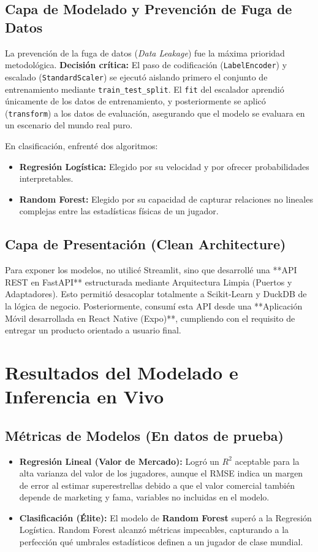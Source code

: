 \documentclass[12pt,letterpaper]{article}
\begin{document}
\subsection{Capa de Modelado y Prevención de Fuga de Datos}
La prevención de la fuga de datos (\textit{Data Leakage}) fue la máxima prioridad metodológica.
\textbf{Decisión crítica:} El paso de codificación (\texttt{LabelEncoder}) y escalado (\texttt{StandardScaler}) se ejecutó aislando primero el conjunto de entrenamiento mediante \texttt{train\_test\_split}. El \texttt{fit} del escalador aprendió únicamente de los datos de entrenamiento, y posteriormente se aplicó (\texttt{transform}) a los datos de evaluación, asegurando que el modelo se evaluara en un escenario del mundo real puro.

En clasificación, enfrenté dos algoritmos:
\begin{itemize}
    \item \textbf{Regresión Logística:} Elegido por su velocidad y por ofrecer probabilidades interpretables.
    \item \textbf{Random Forest:} Elegido por su capacidad de capturar relaciones no lineales complejas entre las estadísticas físicas de un jugador.
\end{itemize}

\subsection{Capa de Presentación (Clean Architecture)}
Para exponer los modelos, no utilicé Streamlit, sino que desarrollé una **API REST en FastAPI** estructurada mediante Arquitectura Limpia (Puertos y Adaptadores). Esto permitió desacoplar totalmente a Scikit-Learn y DuckDB de la lógica de negocio. Posteriormente, consumí esta API desde una **Aplicación Móvil desarrollada en React Native (Expo)**, cumpliendo con el requisito de entregar un producto orientado a usuario final.

\newpage
\section{Resultados del Modelado e Inferencia en Vivo}

\subsection{Métricas de Modelos (En datos de prueba)}
\begin{itemize}
    \item \textbf{Regresión Lineal (Valor de Mercado):} Logró un $R^2$ aceptable para la alta varianza del valor de los jugadores, aunque el RMSE indica un margen de error al estimar superestrellas debido a que el valor comercial también depende de marketing y fama, variables no incluidas en el modelo.
    \item \textbf{Clasificación (Élite):} El modelo de \textbf{Random Forest} superó a la Regresión Logística. Random Forest alcanzó métricas impecables, capturando a la perfección qué umbrales estadísticos definen a un jugador de clase mundial.
\end{itemize}
\end{document}
